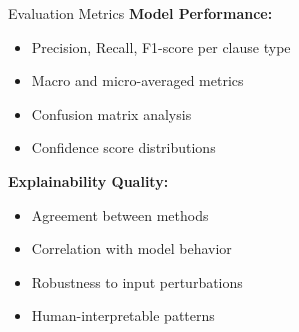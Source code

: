 \begin{frame}{Evaluation Metrics}
\textbf{Model Performance:}
\begin{itemize}
    \item Precision, Recall, F1-score per clause type
    \item Macro and micro-averaged metrics
    \item Confusion matrix analysis
    \item Confidence score distributions
\end{itemize}

\vspace{0.5cm}
\textbf{Explainability Quality:}
\begin{itemize}
    \item {} Agreement between methods
    \item {} Correlation with model behavior
    \item {} Robustness to input perturbations
    \item {} Human-interpretable patterns
\end{itemize}
\end{frame}
